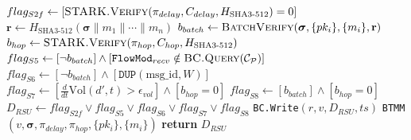 \documentclass[12pt, a4paper]{report}
\begin{document}
\begin{algorithm}[H]
\caption{RSU Full Detection (\texttt{LRAD-RSU})}
\begin{algorithmic}[1]
\small
{}
  \State $flag_{S2f} \gets
         [\textsc{STARK.Verify}(\pi_{delay},
         C_{delay}, H_{\text{SHA3-512}}) = 0]$
         \hfill{}
  \State $\mathbf{r} \gets
         H_{\text{SHA3-512}}(\boldsymbol{\sigma}
         \| m_1 \| \cdots \| m_n)$
         \hfill{}
  \State $b_{batch} \gets
         \textsc{BatchVerify}(\boldsymbol{\sigma},
         \{pk_i\}, \{m_i\}, \mathbf{r})$
         \hfill{}
  \State $b_{hop} \gets
         \textsc{STARK.Verify}(\pi_{hop},
         C_{hop}, H_{\text{SHA3-512}})$
         \hfill{}
  \State $flag_{S5} \gets [\neg b_{batch}]
         \land[\texttt{FlowMod}_{recv}
         \notin\textsc{BC.Query}
         (\mathcal{C}_\mathcal{P})]$
         \hfill{}
  \State $flag_{S6} \gets [\neg b_{batch}]
         \land[\texttt{DUP}(\text{msg\_id},W)]$
         \hfill{}
  \State $flag_{S7} \gets
         [\tfrac{d}{dt}\text{Vol}(d',t)
         {>}\epsilon_{vol}]
         \land[b_{hop}{=}0]$
         \hfill{}
  \State $flag_{S8} \gets [b_{batch}]
         \land[b_{hop}{=}0]$
         \hfill{}
  \State $D_{RSU} \gets flag_{S2f}\lor flag_{S5}
         \lor flag_{S6}\lor flag_{S7}\lor flag_{S8}$
    \State \texttt{BC.Write}$(r,v,D_{RSU},ts)$
    \State \texttt{BTMM}$(v, \boldsymbol{\sigma},
           \pi_{delay}, \pi_{hop},
           \{pk_i\}, \{m_i\})$
  \EndIf
  \State \textbf{return} $D_{RSU}$
\EndProcedure
\end{algorithmic}
\label{alg:lrad_rsu}
\end{algorithm}
\end{document}
